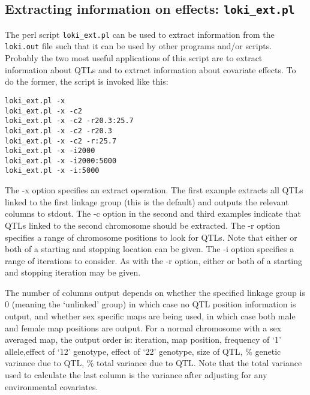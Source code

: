 \documentclass[10pt,a4paper]{article}
\begin{document}
\subsection{Extracting information on effects: \texttt{loki\_ext.pl}}
The perl script \verb+loki_ext.pl+ can be used to extract information from
the \verb+loki.out+ file such that it can be used by other programs and/or
scripts.  Probably the two most useful applications of this script are to
extract information about QTLs and to extract information about
covariate effects.  To do the former, the script is invoked like this:
\begin{verbatim}
loki_ext.pl -x
loki_ext.pl -x -c2
loki_ext.pl -x -c2 -r20.3:25.7
loki_ext.pl -x -c2 -r20.3
loki_ext.pl -x -c2 -r:25.7
loki_ext.pl -x -i2000
loki_ext.pl -x -i2000:5000
loki_ext.pl -x -i:5000
\end{verbatim}
The -x option specifies an extract operation.  The first example extracts
all QTLs linked to the first linkage group (this is the default) and outputs
the relevant columns to stdout.  The -c option in the second and third
examples indicate that QTLs linked to the second chromosome should be
extracted.  The -r option specifies a range of chromosome positions to look
for QTLs.  Note that either or both of a starting and stopping location can
be given.  The -i option specifies a range of iterations to consider.  As
with the -r option, either or both of a starting and stopping
iteration may be given.

The number of columns output depends on whether the specified linkage group
is 0 (meaning the `unlinked' group) in which case no QTL position
information is output, and whether sex specific maps are being used, in
which case both male and female map positions are output.  For a normal
chromosome with a sex averaged map, the output order is: iteration, map
position, frequency of `1' allele,effect of `12' genotype, effect of `22'
genotype, size of QTL, \% genetic variance due to QTL, \% total variance due
to QTL.  Note that the total variance used to calculate the last column is
the variance after adjusting for any environmental covariates.
\end{document}
